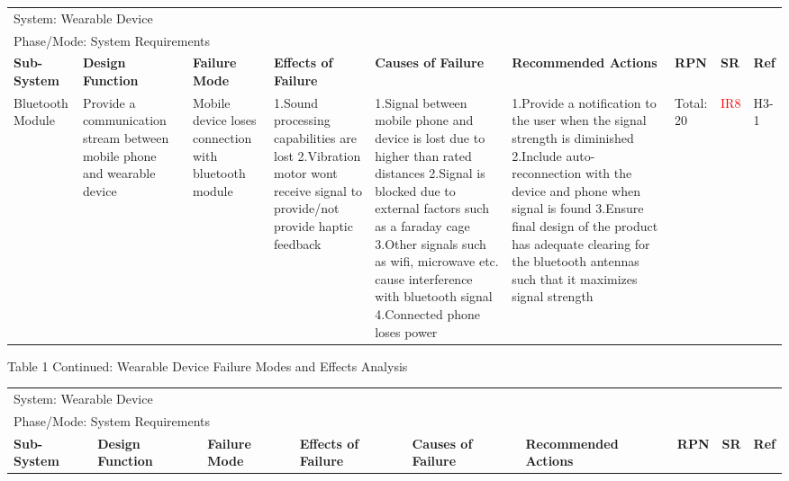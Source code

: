 \documentclass[12pt, titlepage]{article}
\begin{document}
\begin{landscape}
\begin{table}[H]
\begin{tabular}{| p{} | p{}  | p{} | p{} | p{} | p{} | p{} | p{} | p{} |}
        \multicolumn{9}{|l|}{System: Wearable Device} \\
        \multicolumn{9}{|l|}{Phase/Mode: System Requirements} \\ \hline
        \textbf{Sub-System} & \textbf{Design Function} & \textbf{Failure Mode} & \textbf{Effects of Failure} & \textbf{Causes of Failure} & \textbf{Recommended Actions} & \textbf{RPN} & \textbf{SR} & \textbf{Ref} \\ \hline
    
         Bluetooth Module & Provide a communication stream between mobile phone and wearable device & Mobile device loses connection with  bluetooth module & 1.Sound processing capabilities are lost \newline 2.Vibration motor wont receive signal to provide/not provide haptic feedback  & 1.Signal between mobile phone and  device is lost due to higher than rated distances \newline 2.Signal is blocked due to external factors such as a faraday cage \newline 3.Other signals such as wifi, microwave etc. cause interference with bluetooth signal \newline 4.Connected phone loses power  & 1.Provide a notification to the user when the signal strength is diminished \newline 2.Include auto-reconnection with the device and phone when signal is found \newline 3.Ensure final design of the product has adequate clearing for the bluetooth antennas such that it maximizes signal strength  &  Total: 20 & \textcolor{red}{IR8} & H3-1 \\ \cline{1-9}
        
        \end{tabular}

\end{table}

\begin{table}[H]
    \centering
        Table 1 Continued: Wearable Device Failure Modes and Effects Analysis

        \begin{tabular}{| p{} | p{}  | p{} | p{} | p{} | p{} | p{} | p{} | p{} |}
            \hline
        
        \multicolumn{9}{|l|}{System: Wearable Device} \\
        \multicolumn{9}{|l|}{Phase/Mode: System Requirements} \\ \hline
        \textbf{Sub-System} & \textbf{Design Function} & \textbf{Failure Mode} & \textbf{Effects of Failure} & \textbf{Causes of Failure} & \textbf{Recommended Actions} & \textbf{RPN} & \textbf{SR} & \textbf{Ref} \\ \hline


\end{tabular}
\end{table}
\end{landscape}
\end{document}
